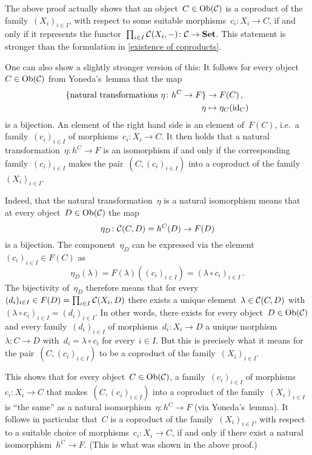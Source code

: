 \begin{remark*}
  The above proof actually shows that an object~$C \in \operatorname{Ob}(\mathcal{C})$ is a coproduct of the family~$(X_i)_{i \in I}$, with respect to some suitable morphisms~$c_i \colon X_i \to C$, if and only if it represents the functor~$\prod_{i \in I} \mathcal{C}(X_i, -) \colon \mathcal{C} \to \mathbf{Set}$.
  This statement is stronger than the formulation in \cref{existence of coproducts}.
  
  One can also show a slightly stronger version of this:
  It follows for every object~$C \in \operatorname{Ob}(\mathcal{C})$ from Yoneda’s~lemma that the map
  \begin{align*}
              \{ \text{natural transformations~$\eta \colon h^C \to F$} \}
    &\to      F(C) \,,
    \\
              \eta
    &\mapsto  \eta_C(\operatorname{id}_C)
  \end{align*}
  is a bijection.
  An element of the right hand side is an element of~$F(C)$, i.e.\ a family~$(c_i)_{i \in I}$ of morphisms~$c_i \colon X_i \to C$.
  It then holds that a natural transformation~$\eta \colon h^C \to F$ is an isomorphism if and only if the corresponding family~$(c_i)_{i \in I}$ makes the pair~$(C, (c_i)_{i \in I})$ into a coproduct of the family~$(X_i)_{i \in I}$.
  
  Indeed, that the natural transformation~$\eta$ is a natural isomorphism means that at every object~$D \in \operatorname{Ob}(\mathcal{C})$ the map
  \[
            \eta_D
    \colon  \mathcal{C}(C,D)
    =       h^C(D)
    \to     F(D)
  \]
  is a bijection.
  The component~$\eta_D$ can be expressed via the element~$(c_i)_{i \in I} \in F(C)$ as
  \[
      \eta_D(\lambda)
    = F(\lambda)( (c_i)_{i \in I} )
    = (\lambda \circ c_i)_{i \in I} \,.
  \]
  The bijectivity of~$\eta_D$ therefore means that for every~$(d_i)_{i \in I} \in F(D) = \prod_{i \in I} \mathcal{C}(X_i, D)$ there exists a unique element~$\lambda \in \mathcal{C}(C, D)$ with~$(\lambda \circ c_i)_{i \in I} = (d_i)_{i \in I}$.
  In other words, there exists for every object~$D \in \operatorname{Ob}(\mathcal{C})$ and every family~$(d_i)_{i \in I}$ of morphisms~$d_i \colon X_i \to D$ a unique morphism~$\lambda \colon C \to D$ with~$d_i = \lambda \circ c_i$ for every~$i \in I$.
  But this is precisely what it means for the pair~$(C, (c_i)_{i \in I})$ to be a coproduct of the family~$(X_i)_{i \in I}$.
  
  This shows that for every object~$C \in \operatorname{Ob}(\mathcal{C})$, a family~$(c_i)_{i \in I}$ of morphisms~$c_i \colon X_i \to C$ that makes~$(C, (c_i)_{i \in I})$ into a coproduct of the family~$(X_i)_{i \in I}$ is \enquote{the same} as a natural isomorphism~$\eta \colon h^C \to F$ (via Yoneda’s~lemma).
  It follows in particular that~$C$ is a coproduct of the family~$(X_i)_{i \in I}$, with respect to a suitable choice of morphisms~$c_i \colon X_i \to C$, if and only if there exist a natural isomorphism~$h^C \to F$.
  (This is what was shown in the above proof.)
\end{remark*}





